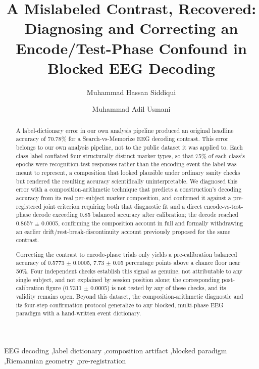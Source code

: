 \documentclass[preprint,12pt]{elsarticle}
\begin{document}
\begin{frontmatter}

\title{A Mislabeled Contrast, Recovered: Diagnosing and Correcting an Encode/Test-Phase Confound in Blocked EEG Decoding}

\author[inst1]{Muhammad Hassan Siddiqui}
\author[inst1]{Muhammad Adil Usmani}

\begin{abstract}
A label-dictionary error in our own analysis pipeline produced an original headline accuracy of 70.78\% for a Search-vs-Memorize EEG decoding contrast. This error belongs to our own analysis pipeline, not to the public dataset it was applied to. Each class label conflated four structurally distinct marker types, so that 75\% of each class's epochs were recognition-test responses rather than the encoding event the label was meant to represent, a composition that looked plausible under ordinary sanity checks but rendered the resulting accuracy scientifically uninterpretable. We diagnosed this error with a composition-arithmetic technique that predicts a construction's decoding accuracy from its real per-subject marker composition, and confirmed it against a pre-registered joint criterion requiring both that diagnostic fit and a direct encode-vs-test-phase decode exceeding 0.85 balanced accuracy after calibration; the decode reached 0.8657 $\pm$ 0.0005, confirming the composition account in full and formally withdrawing an earlier drift/rest-break-discontinuity account previously proposed for the same contrast.

Correcting the contrast to encode-phase trials only yields a pre-calibration balanced accuracy of 0.5773 $\pm$ 0.0005, 7.73 $\pm$ 0.05 percentage points above a chance floor near 50\%. Four independent checks establish this signal as genuine, not attributable to any single subject, and not explained by session position alone; the corresponding post-calibration figure (0.7311 $\pm$ 0.0005) is not tested by any of these checks, and its validity remains open. Beyond this dataset, the composition-arithmetic diagnostic and its four-step confirmation protocol generalize to any blocked, multi-phase EEG paradigm with a hand-written event dictionary.
\end{abstract}

\begin{keyword}
EEG decoding \sep label dictionary \sep composition artifact \sep blocked paradigm \sep Riemannian geometry \sep pre-registration
\end{keyword}

\end{frontmatter}
\linenumbers
\end{document}
